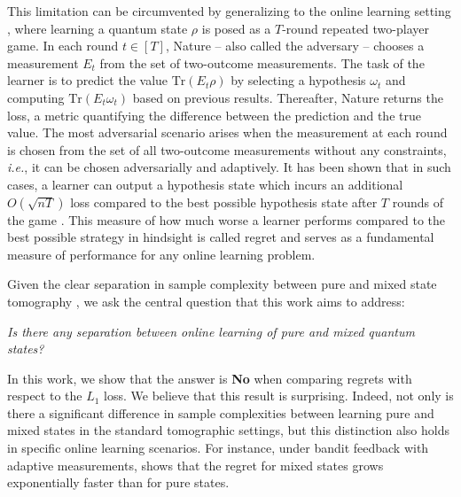 This limitation can be circumvented by generalizing to the online learning setting \citep{aaronson2019online, chen2020practicaladaptivealgorithmsonline,Chen2024adaptive}, where learning a quantum state $\rho$ is posed as a $T$-round repeated two-player game. In each round $t \in [T]$, Nature -- also called the adversary -- chooses a measurement $E_t$ from the set of two-outcome measurements. The task of the learner is to predict the value $\mathrm{Tr}(E_t\rho)$ by selecting a hypothesis $\omega_t$ and computing $\mathrm{Tr}(E_t\omega_t)$ based on previous results. Thereafter, Nature returns the loss, a metric quantifying the difference between the prediction and the true value. The most adversarial scenario arises when the measurement at each round is chosen from the set of all two-outcome measurements without any constraints, \textit{i.e.}, it can be chosen adversarially and adaptively. It has been shown that in such cases, a learner can output a hypothesis state which incurs an additional $O(\sqrt{nT})$ loss compared to the best possible hypothesis state after $T$ rounds of the game \citep{aaronson2019online}. This measure of how much worse a learner performs compared to the best possible strategy in hindsight is called regret and serves as a fundamental measure of performance for any online learning problem.


Given the clear separation in sample complexity between pure and mixed state tomography \citep{kueng2014lowrankmatrixrecovery, harrow16sampletomography}, we ask the central question that this work aims to address:

\begin{center}
\textit{Is there any separation between online learning of pure and mixed quantum states?}
\end{center}


\noindent In this work, we show that the answer is \textbf{No} when comparing regrets with respect to the $L_1$ loss. We believe that this result is surprising. Indeed, not only is there a significant difference in sample complexities between learning pure and mixed states in the standard tomographic settings, but this distinction also holds in specific online learning scenarios. For instance, under bandit feedback with adaptive measurements, \citet{Lumbreras_2022, lumbreras2024learningpurequantumstates} shows that the regret for mixed states grows exponentially faster than for pure states.

